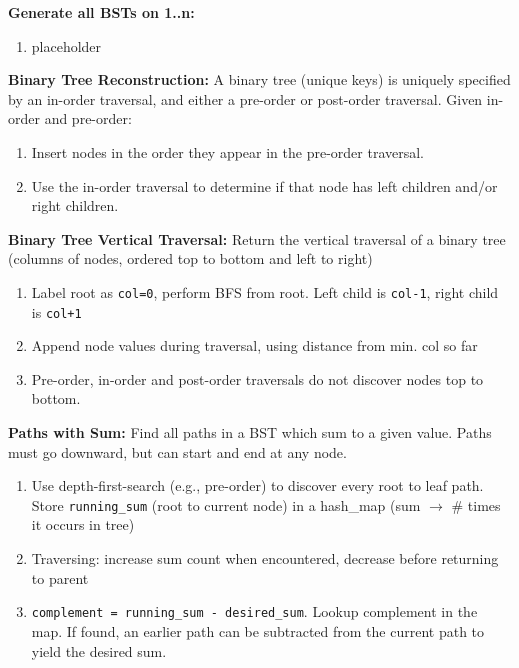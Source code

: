 \documentclass[12pt]{article}
\begin{document}
\vspace{5mm}
\noindent
\textbf{Generate all BSTs on 1..n:}
\begin{enumerate}
\item placeholder
\end{enumerate}


\vspace{5mm}
\noindent
\textbf{Binary Tree Reconstruction:}
A binary tree (unique keys) is uniquely specified by an in-order traversal, 
and either a pre-order or post-order traversal. Given in-order and pre-order:
\begin{enumerate}
\item Insert nodes in the order they appear in the pre-order traversal.
\item Use the in-order traversal to determine if that node has left children and/or right children.
\end{enumerate}


\vspace{5mm}
\noindent
\textbf{Binary Tree Vertical Traversal:}
Return the vertical traversal of a binary tree (columns of nodes, ordered top to bottom and left to right)
\begin{enumerate}
\item Label root as \texttt{col=0}, perform BFS from root. Left child is \texttt{col-1}, 
right child is \texttt{col+1} 
\item Append node values during traversal, using distance from min. col so far
\item Pre-order, in-order and post-order traversals do not discover nodes top to bottom.
\end{enumerate}


\vspace{5mm}
\noindent
\textbf{Paths with Sum:}
Find all paths in a BST which sum to a given value. Paths must go downward, but can start and end at any node.
\begin{enumerate}
\item Use depth-first-search (e.g., pre-order) to discover every root to leaf path. Store 
\texttt{running\_sum} (root to current node) in a hash\_map (sum $\rightarrow$ \# times it occurs in tree)
\item Traversing: increase sum count when encountered, decrease before returning to parent
\item \texttt{complement = running\_sum - desired\_sum}. Lookup complement in the map.
If found, an earlier path can be subtracted from the current path to yield the desired sum.
\end{enumerate}
\end{document}
